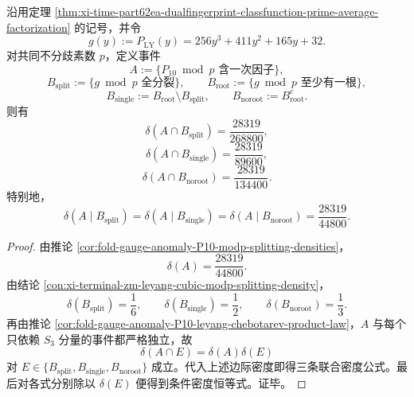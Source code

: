 \begin{corollary}\label{cor:xi-time-part62ea-A-leyang-threeway-density}
沿用定理 \ref{thm:xi-time-part62ea-dualfingerprint-classfunction-prime-average-factorization} 的记号，并令
\[
g(y):=P_{\mathrm{LY}}(y)=256y^3+411y^2+165y+32.
\]
对共同不分歧素数 \(p\)，定义事件
\[
A:=\{\text{\(P_{10}\bmod p\) 含一次因子}\},
\]
\[
B_{\mathrm{split}}:=\{\text{\(g\bmod p\) 全分裂}\},
\qquad
B_{\mathrm{root}}:=\{\text{\(g\bmod p\) 至少有一根}\},
\]
\[
B_{\mathrm{single}}:=B_{\mathrm{root}}\setminus B_{\mathrm{split}},
\qquad
B_{\mathrm{noroot}}:=B_{\mathrm{root}}^{c}.
\]
则有
\[
\delta(A\cap B_{\mathrm{split}})=\frac{28319}{268800},
\]
\[
\delta(A\cap B_{\mathrm{single}})=\frac{28319}{89600},
\]
\[
\delta(A\cap B_{\mathrm{noroot}})=\frac{28319}{134400}.
\]
特别地，
\[
\delta(A\mid B_{\mathrm{split}})
=
\delta(A\mid B_{\mathrm{single}})
=
\delta(A\mid B_{\mathrm{noroot}})
=
\frac{28319}{44800}.
\]
\end{corollary}
\begin{proof}
由推论 \ref{cor:fold-gauge-anomaly-P10-modp-splitting-densities}，
\[
\delta(A)=\frac{28319}{44800}.
\]
由结论 \ref{con:xi-terminal-zm-leyang-cubic-modp-splitting-density}，
\[
\delta(B_{\mathrm{split}})=\frac16,
\qquad
\delta(B_{\mathrm{single}})=\frac12,
\qquad
\delta(B_{\mathrm{noroot}})=\frac13.
\]
再由推论 \ref{cor:fold-gauge-anomaly-P10-leyang-chebotarev-product-law}，\(A\) 与每个只依赖 \(S_3\) 分量的事件都严格独立，故
\[
\delta(A\cap E)=\delta(A)\delta(E)
\]
对 \(E\in\{B_{\mathrm{split}},B_{\mathrm{single}},B_{\mathrm{noroot}}\}\) 成立。代入上述边际密度即得三条联合密度公式。最后对各式分别除以 \(\delta(E)\) 便得到条件密度恒等式。证毕。
\end{proof}

